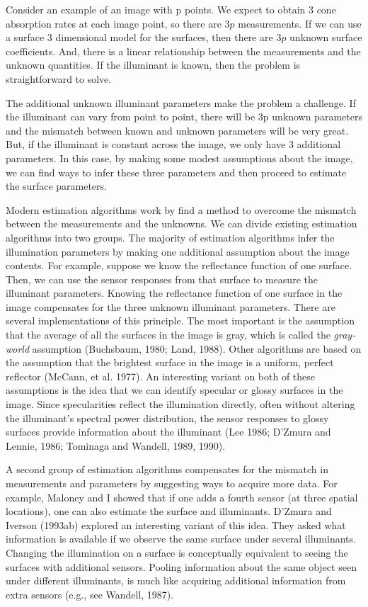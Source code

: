 Consider an example of an image with p points.  We expect to obtain 3
cone absorption rates at each image point, so there are $3p$
measurements.  If we can use a surface 3 dimensional model for the
surfaces, then there are $3p$ unknown surface coefficients.  And,
there is a linear relationship between the measurements and the
unknown quantities.  If the illuminant is known, then the problem is
straightforward to solve.

The additional unknown illuminant parameters make the problem a
challenge.  If the illuminant can vary from point to point, there will
be 3p unknown parameters and the mismatch between known and unknown
parameters will be very great.  But, if the illuminant is constant
across the image, we only have 3 additional parameters.  In this case,
by making some modest assumptions about the image, we can find ways to
infer these three parameters and then proceed to estimate the surface
parameters.

Modern estimation algorithms work by find a method to overcome the
mismatch between the measurements and the unknowns.  We can divide
existing estimation algorithms into two groups. The majority of
estimation algorithms infer the illumination parameters by making one
additional assumption about the image contents.  For example, suppose
we know the reflectance function of one surface.  Then, we can use the
sensor responses from that surface to measure the illuminant
parameters.  Knowing the reflectance function of one surface in the
image compensates for the three unknown illuminant parameters.
There are several implementations of this principle.  The most
important is the assumption that the average of all the surfaces in
the image is gray, which is called the {\em gray-world} assumption
(Buchsbaum, 1980; Land, 1988).  Other algorithms are based on the
assumption that the brightest surface in the image is a uniform,
perfect reflector (McCann, et al. 1977).  An interesting variant on both of
these assumptions is the idea that we can identify specular or glossy
surfaces in the image.  Since specularities reflect the illumination
directly, often without altering the illuminant's spectral power
distribution, the sensor responses to glossy surfaces provide
information about the illuminant (Lee 1986; D'Zmura and Lennie, 1986;
Tominaga and Wandell, 1989, 1990).

A second group of estimation algorithms compensates for the mismatch
in measurements and parameters by suggesting ways to acquire more
data.  For example, Maloney and I showed that if one adds a fourth
sensor (at three spatial locations), one can also estimate the surface
and illuminants.  D'Zmura and Iverson (1993ab) explored an interesting
variant of this idea.  They asked what information is available if we
observe the same surface under several illuminants.  Changing the
illumination on a surface is conceptually equivalent to seeing the
surfaces with additional sensors.  Pooling information about the same
object seen under different illuminants, is much like acquiring
additional information from extra sensors (e.g., see Wandell, 1987).

